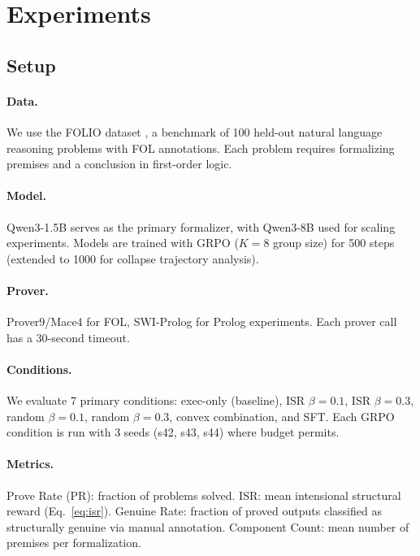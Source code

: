 \documentclass[11pt,a4paper]{article}
\begin{document}
\section{Experiments}

\subsection{Setup}

\paragraph{Data.} We use the FOLIO dataset \cite{han2022folio}, a benchmark of 100 held-out natural language reasoning problems with FOL annotations. Each problem requires formalizing premises and a conclusion in first-order logic.

\paragraph{Model.} Qwen3-1.5B serves as the primary formalizer, with Qwen3-8B used for scaling experiments. Models are trained with GRPO ($K{=}8$ group size) for 500 steps (extended to 1000 for collapse trajectory analysis).

\paragraph{Prover.} Prover9/Mace4 for FOL, SWI-Prolog for Prolog experiments. Each prover call has a 30-second timeout.

\paragraph{Conditions.} We evaluate 7 primary conditions: exec-only (baseline), ISR $\beta{=}0.1$, ISR $\beta{=}0.3$, random $\beta{=}0.1$, random $\beta{=}0.3$, convex combination, and SFT. Each GRPO condition is run with 3 seeds (s42, s43, s44) where budget permits.

\paragraph{Metrics.} Prove Rate (PR): fraction of problems solved. ISR: mean intensional structural reward (Eq.~\ref{eq:isr}). Genuine Rate: fraction of proved outputs classified as structurally genuine via manual annotation. Component Count: mean number of premises per formalization.
\end{document}
